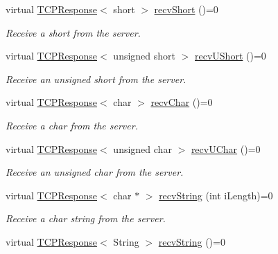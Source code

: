 \begin{DoxyCompactItemize}
virtual \hyperlink{class_rad_jav_1_1_networking_1_1_t_c_p_response}{T\+C\+P\+Response}$<$ short $>$ \hyperlink{class_rad_jav_1_1_networking_1_1_tcpip_client_a4906cf1500267303820348d4ad13df5e}{recv\+Short} ()=0
\begin{DoxyCompactList}\small\item\em Receive a short from the server. \end{DoxyCompactList}\item 
virtual \hyperlink{class_rad_jav_1_1_networking_1_1_t_c_p_response}{T\+C\+P\+Response}$<$ unsigned short $>$ \hyperlink{class_rad_jav_1_1_networking_1_1_tcpip_client_a3da0d0b500859f751b223162330f91fe}{recv\+U\+Short} ()=0
\begin{DoxyCompactList}\small\item\em Receive an unsigned short from the server. \end{DoxyCompactList}\item 
virtual \hyperlink{class_rad_jav_1_1_networking_1_1_t_c_p_response}{T\+C\+P\+Response}$<$ char $>$ \hyperlink{class_rad_jav_1_1_networking_1_1_tcpip_client_abeb3730201f542dae6e6d4d29004c29d}{recv\+Char} ()=0
\begin{DoxyCompactList}\small\item\em Receive a char from the server. \end{DoxyCompactList}\item 
virtual \hyperlink{class_rad_jav_1_1_networking_1_1_t_c_p_response}{T\+C\+P\+Response}$<$ unsigned char $>$ \hyperlink{class_rad_jav_1_1_networking_1_1_tcpip_client_a3286aa902385af628b66b1d06a4ca051}{recv\+U\+Char} ()=0
\begin{DoxyCompactList}\small\item\em Receive an unsigned char from the server. \end{DoxyCompactList}\item 
virtual \hyperlink{class_rad_jav_1_1_networking_1_1_t_c_p_response}{T\+C\+P\+Response}$<$ char $\ast$ $>$ \hyperlink{class_rad_jav_1_1_networking_1_1_tcpip_client_abbbbbd6a99d54e540206dea2fd9a4624}{recv\+String} (int i\+Length)=0
\begin{DoxyCompactList}\small\item\em Receive a char string from the server. \end{DoxyCompactList}\item 
virtual \hyperlink{class_rad_jav_1_1_networking_1_1_t_c_p_response}{T\+C\+P\+Response}$<$ String $>$ \hyperlink{class_rad_jav_1_1_networking_1_1_tcpip_client_ab6aa0e3d40288357f58bde9f7184f874}{recv\+String} ()=0

\end{DoxyCompactItemize}
